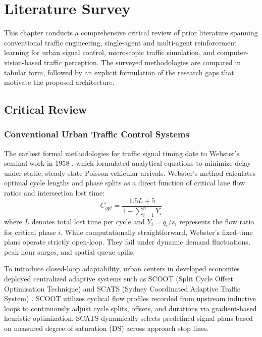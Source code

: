 \chapter{Literature Survey}
\label{ch:lit_survey}

This chapter conducts a comprehensive critical review of prior literature spanning conventional traffic engineering, single-agent and multi-agent reinforcement learning for urban signal control, microscopic traffic simulation, and computer-vision-based traffic perception. The surveyed methodologies are compared in tabular form, followed by an explicit formulation of the research gaps that motivate the proposed architecture.

\section{Critical Review}
\label{sec:critical_review}

\subsection{Conventional Urban Traffic Control Systems}
The earliest formal methodologies for traffic signal timing date to Webster's seminal work in 1958 \cite{ref_webster1958}, which formulated analytical equations to minimize delay under static, steady-state Poisson vehicular arrivals. Webster's method calculates optimal cycle lengths and phase splits as a direct function of critical lane flow ratios and intersection lost time:
\begin{equation}
C_{opt} = \frac{1.5L + 5}{1 - \sum_{i=1}^n Y_i}
\end{equation}
where $L$ denotes total lost time per cycle and $Y_i = q_i / s_i$ represents the flow ratio for critical phase $i$. While computationally straightforward, Webster's fixed-time plans operate strictly open-loop. They fail under dynamic demand fluctuations, peak-hour surges, and spatial queue spills.

To introduce closed-loop adaptability, urban centers in developed economies deployed centralized adaptive systems such as SCOOT (Split Cycle Offset Optimisation Technique) \cite{ref_hunt1981} and SCATS (Sydney Coordinated Adaptive Traffic System) \cite{ref_scats1980}. SCOOT utilizes cyclical flow profiles recorded from upstream inductive loops to continuously adjust cycle splits, offsets, and durations via gradient-based heuristic optimization. SCATS dynamically selects predefined signal plans based on measured degree of saturation (DS) across approach stop lines.

